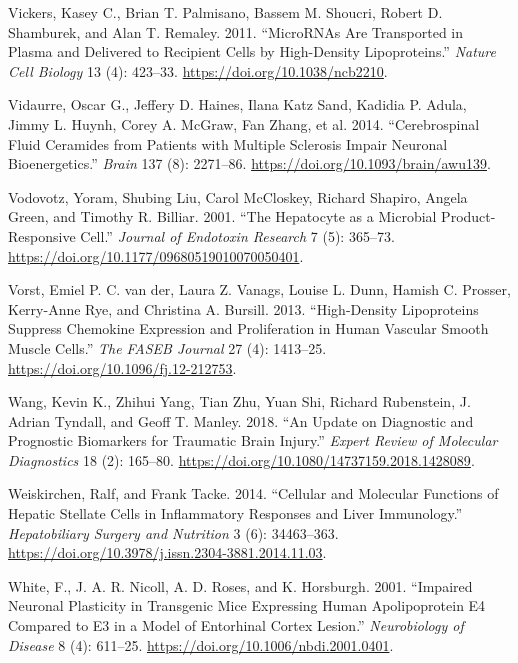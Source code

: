 \documentclass[9pt,lineno]{elife}
\newlength{\cslhangindent}
\newlength{\cslentryspacingunit} %
\newenvironment{CSLReferences}[2] %
 {%
  \setlength{\parindent}{0pt}
  \ifodd #1
  \let\oldpar\par
  \def\par{\hangindent=\cslhangindent\oldpar}
  \fi
  \setlength{\parskip}{#2\cslentryspacingunit}
 }%
 {}
\begin{document}
\begin{CSLReferences}{1}{0}
\leavevmode{}%
Vickers, Kasey C., Brian T. Palmisano, Bassem M. Shoucri, Robert D. Shamburek, and Alan T. Remaley. 2011. {``{MicroRNAs} Are Transported in Plasma and Delivered to Recipient Cells by High-Density Lipoproteins.''} \emph{Nature Cell Biology} 13 (4): 423--33. \url{https://doi.org/10.1038/ncb2210}.

\leavevmode{}%
Vidaurre, Oscar G., Jeffery D. Haines, Ilana Katz Sand, Kadidia P. Adula, Jimmy L. Huynh, Corey A. McGraw, Fan Zhang, et al. 2014. {``Cerebrospinal Fluid Ceramides from Patients with Multiple Sclerosis Impair Neuronal Bioenergetics.''} \emph{Brain} 137 (8): 2271--86. \url{https://doi.org/10.1093/brain/awu139}.

\leavevmode{}%
Vodovotz, Yoram, Shubing Liu, Carol McCloskey, Richard Shapiro, Angela Green, and Timothy R. Billiar. 2001. {``The Hepatocyte as a Microbial Product-Responsive Cell.''} \emph{Journal of Endotoxin Research} 7 (5): 365--73. \url{https://doi.org/10.1177/09680519010070050401}.

\leavevmode{}%
Vorst, Emiel P. C. van der, Laura Z. Vanags, Louise L. Dunn, Hamish C. Prosser, Kerry-Anne Rye, and Christina A. Bursill. 2013. {``High-Density Lipoproteins Suppress Chemokine Expression and Proliferation in Human Vascular Smooth Muscle Cells.''} \emph{The FASEB Journal} 27 (4): 1413--25. \url{https://doi.org/10.1096/fj.12-212753}.

\leavevmode{}%
Wang, Kevin K., Zhihui Yang, Tian Zhu, Yuan Shi, Richard Rubenstein, J. Adrian Tyndall, and Geoff T. Manley. 2018. {``An Update on Diagnostic and Prognostic Biomarkers for Traumatic Brain Injury.''} \emph{Expert Review of Molecular Diagnostics} 18 (2): 165--80. \url{https://doi.org/10.1080/14737159.2018.1428089}.

\leavevmode{}%
Weiskirchen, Ralf, and Frank Tacke. 2014. {``Cellular and Molecular Functions of Hepatic Stellate Cells in Inflammatory Responses and Liver Immunology.''} \emph{Hepatobiliary Surgery and Nutrition} 3 (6): 34463--363. \url{https://doi.org/10.3978/j.issn.2304-3881.2014.11.03}.

\leavevmode{}%
White, F., J. A. R. Nicoll, A. D. Roses, and K. Horsburgh. 2001. {``Impaired {Neuronal Plasticity} in {Transgenic Mice Expressing Human Apolipoprotein E4 Compared} to {E3} in a {Model} of {Entorhinal Cortex Lesion}.''} \emph{Neurobiology of Disease} 8 (4): 611--25. \url{https://doi.org/10.1006/nbdi.2001.0401}.


\end{CSLReferences}
\end{document}
